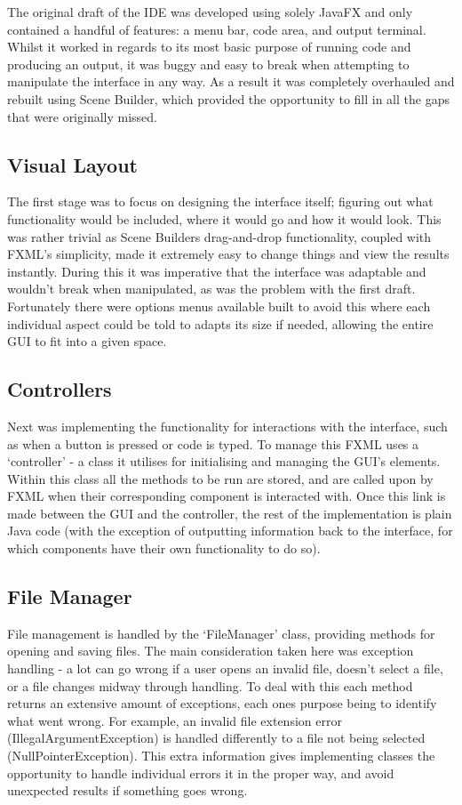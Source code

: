 \documentclass[
]{report}
\begin{document}
The original draft of the IDE was developed using solely JavaFX and only
contained a handful of features: a menu bar, code area, and output
terminal. Whilst it worked in regards to its most basic purpose of
running code and producing an output, it was buggy and easy to break
when attempting to manipulate the interface in any way. As a result it
was completely overhauled and rebuilt using Scene Builder, which
provided the opportunity to fill in all the gaps that were originally
missed.

\subsection{Visual Layout}
The first stage was to focus on designing the interface itself; figuring
out what functionality would be included, where it would go and how it
would look. This was rather trivial as Scene Builders drag-and-drop
functionality, coupled with FXML's simplicity, made it extremely easy to
change things and view the results instantly. During this it was
imperative that the interface was adaptable and wouldn't break when
manipulated, as was the problem with the first draft. Fortunately there
were options menus available built to avoid this where each individual
aspect could be told to adapts its size if needed, allowing the entire
GUI to fit into a given space.

\subsection{Controllers}
Next was implementing the functionality for interactions with the
interface, such as when a button is pressed or code is typed. To manage
this FXML uses a `controller' - a class it utilises for initialising and
managing the GUI's elements. Within this class all the methods to be run
are stored, and are called upon by FXML when their corresponding
component is interacted with. Once this link is made between the GUI and
the controller, the rest of the implementation is plain Java code (with
the exception of outputting information back to the interface, for which
components have their own functionality to do so).

\subsection{File Manager}
File management is handled by the `FileManager' class, providing methods
for opening and saving files. The main consideration taken here was
exception handling - a lot can go wrong if a user opens an invalid file,
doesn't select a file, or a file changes midway through handling. To
deal with this each method returns an extensive amount of exceptions,
each ones purpose being to identify what went wrong. For example, an
invalid file extension error (IllegalArgumentException) is handled
differently to a file not being selected (NullPointerException). This
extra information gives implementing classes the opportunity to handle
individual errors it in the proper way, and avoid unexpected results if
something goes wrong.
\end{document}

